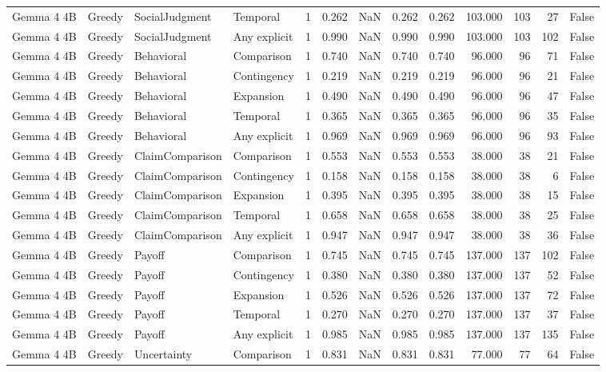 \begin{tabular}{llllrrrrrrrrr}
Gemma 4 4B & Greedy & SocialJudgment & Temporal & 1 & 0.262 & NaN & 0.262 & 0.262 & 103.000 & 103 & 27 & False \\
Gemma 4 4B & Greedy & SocialJudgment & Any explicit & 1 & 0.990 & NaN & 0.990 & 0.990 & 103.000 & 103 & 102 & False \\
Gemma 4 4B & Greedy & Behavioral & Comparison & 1 & 0.740 & NaN & 0.740 & 0.740 & 96.000 & 96 & 71 & False \\
Gemma 4 4B & Greedy & Behavioral & Contingency & 1 & 0.219 & NaN & 0.219 & 0.219 & 96.000 & 96 & 21 & False \\
Gemma 4 4B & Greedy & Behavioral & Expansion & 1 & 0.490 & NaN & 0.490 & 0.490 & 96.000 & 96 & 47 & False \\
Gemma 4 4B & Greedy & Behavioral & Temporal & 1 & 0.365 & NaN & 0.365 & 0.365 & 96.000 & 96 & 35 & False \\
Gemma 4 4B & Greedy & Behavioral & Any explicit & 1 & 0.969 & NaN & 0.969 & 0.969 & 96.000 & 96 & 93 & False \\
Gemma 4 4B & Greedy & ClaimComparison & Comparison & 1 & 0.553 & NaN & 0.553 & 0.553 & 38.000 & 38 & 21 & False \\
Gemma 4 4B & Greedy & ClaimComparison & Contingency & 1 & 0.158 & NaN & 0.158 & 0.158 & 38.000 & 38 & 6 & False \\
Gemma 4 4B & Greedy & ClaimComparison & Expansion & 1 & 0.395 & NaN & 0.395 & 0.395 & 38.000 & 38 & 15 & False \\
Gemma 4 4B & Greedy & ClaimComparison & Temporal & 1 & 0.658 & NaN & 0.658 & 0.658 & 38.000 & 38 & 25 & False \\
Gemma 4 4B & Greedy & ClaimComparison & Any explicit & 1 & 0.947 & NaN & 0.947 & 0.947 & 38.000 & 38 & 36 & False \\
Gemma 4 4B & Greedy & Payoff & Comparison & 1 & 0.745 & NaN & 0.745 & 0.745 & 137.000 & 137 & 102 & False \\
Gemma 4 4B & Greedy & Payoff & Contingency & 1 & 0.380 & NaN & 0.380 & 0.380 & 137.000 & 137 & 52 & False \\
Gemma 4 4B & Greedy & Payoff & Expansion & 1 & 0.526 & NaN & 0.526 & 0.526 & 137.000 & 137 & 72 & False \\
Gemma 4 4B & Greedy & Payoff & Temporal & 1 & 0.270 & NaN & 0.270 & 0.270 & 137.000 & 137 & 37 & False \\
Gemma 4 4B & Greedy & Payoff & Any explicit & 1 & 0.985 & NaN & 0.985 & 0.985 & 137.000 & 137 & 135 & False \\
Gemma 4 4B & Greedy & Uncertainty & Comparison & 1 & 0.831 & NaN & 0.831 & 0.831 & 77.000 & 77 & 64 & False \\

\end{tabular}
